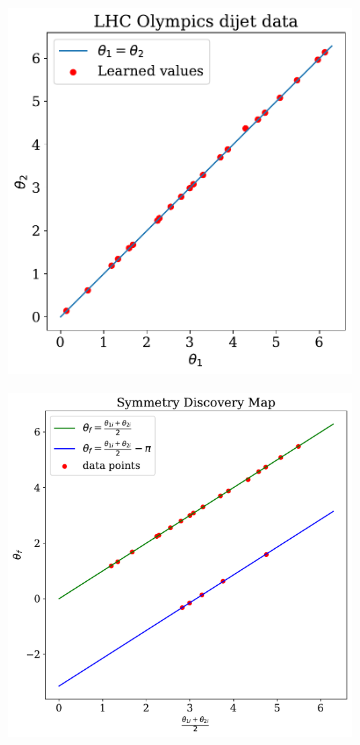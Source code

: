 \begin{figure}
    \centering
    \begin{subfigure}[b]{0.4\textwidth}
        \centering
        \includegraphics[height=\textwidth]{figures/chapter-09/LHCO.pdf}
        \caption{}
        \label{fig:LHCO_i}
    \end{subfigure}
    \begin{subfigure}[b]{0.4\textwidth}
        \centering
        \includegraphics[height=\textwidth]{figures/chapter-09/LHCO_avg.pdf}

\end{subfigure}
\end{figure}
